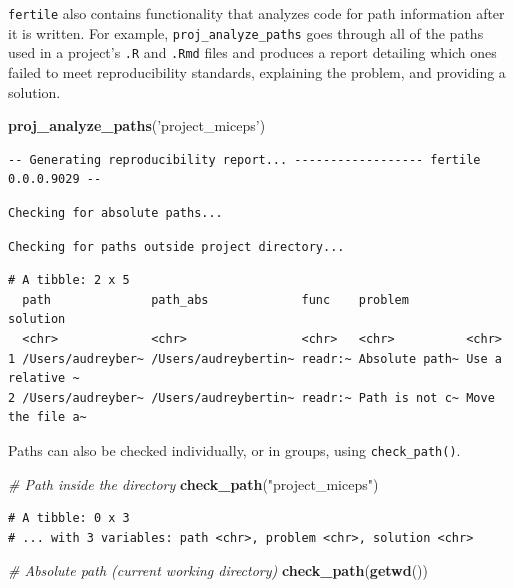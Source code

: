 \documentclass[12pt,twoside]{reedthesis}
\newenvironment{Shaded}{\begin{snugshade}}{\end{snugshade}}
\newcommand{\KeywordTok}[1]{\textcolor[rgb]{0.13,0.29,0.53}{\textbf{#1}}}
\newcommand{\StringTok}[1]{\textcolor[rgb]{0.31,0.60,0.02}{#1}}
\newcommand{\CommentTok}[1]{\textcolor[rgb]{0.56,0.35,0.01}{\textit{#1}}}
\newcommand{\NormalTok}[1]{#1}
\begin{document}
\texttt{fertile} also contains functionality that analyzes code for path
information after it is written. For example,
\texttt{proj\_analyze\_paths} goes through all of the paths used in a
project's \texttt{.R} and \texttt{.Rmd} files and produces a report
detailing which ones failed to meet reproducibility standards,
explaining the problem, and providing a solution.
\begin{Shaded}
\begin{Highlighting}[]
\KeywordTok{proj_analyze_paths}\NormalTok{(}\StringTok{'project_miceps'}\NormalTok{)}
\end{Highlighting}
\end{Shaded}
\begin{verbatim}
-- Generating reproducibility report... ------------------ fertile 0.0.0.9029 --
\end{verbatim}
\begin{verbatim}
Checking for absolute paths...
\end{verbatim}
\begin{verbatim}
Checking for paths outside project directory...
\end{verbatim}
\begin{verbatim}
# A tibble: 2 x 5
  path              path_abs             func    problem        solution        
  <chr>             <chr>                <chr>   <chr>          <chr>           
1 /Users/audreyber~ /Users/audreybertin~ readr:~ Absolute path~ Use a relative ~
2 /Users/audreyber~ /Users/audreybertin~ readr:~ Path is not c~ Move the file a~
\end{verbatim}
Paths can also be checked individually, or in groups, using
\texttt{check\_path()}.
\begin{Shaded}
\begin{Highlighting}[]
\CommentTok{# Path inside the directory}
\KeywordTok{check_path}\NormalTok{(}\StringTok{"project_miceps"}\NormalTok{)}
\end{Highlighting}
\end{Shaded}
\begin{verbatim}
# A tibble: 0 x 3
# ... with 3 variables: path <chr>, problem <chr>, solution <chr>
\end{verbatim}
\begin{Shaded}
\begin{Highlighting}[]
\CommentTok{# Absolute path (current working directory)}
\KeywordTok{check_path}\NormalTok{(}\KeywordTok{getwd}\NormalTok{())}
\end{Highlighting}
\end{Shaded}
\end{document}
